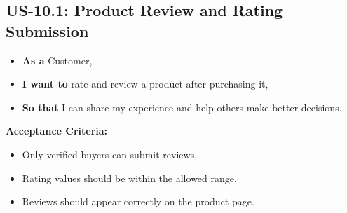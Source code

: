 \subsection*{US-10.1: Product Review and Rating Submission}
\begin{itemize}
    \item \textbf{As a} Customer,
    \item \textbf{I want to} rate and review a product after purchasing it,
    \item \textbf{So that} I can share my experience and help others make better decisions.
\end{itemize}

\noindent\textbf{Acceptance Criteria:}
\begin{itemize}
    \item Only verified buyers can submit reviews.
    \item Rating values should be within the allowed range.
    \item Reviews should appear correctly on the product page.
\end{itemize}
